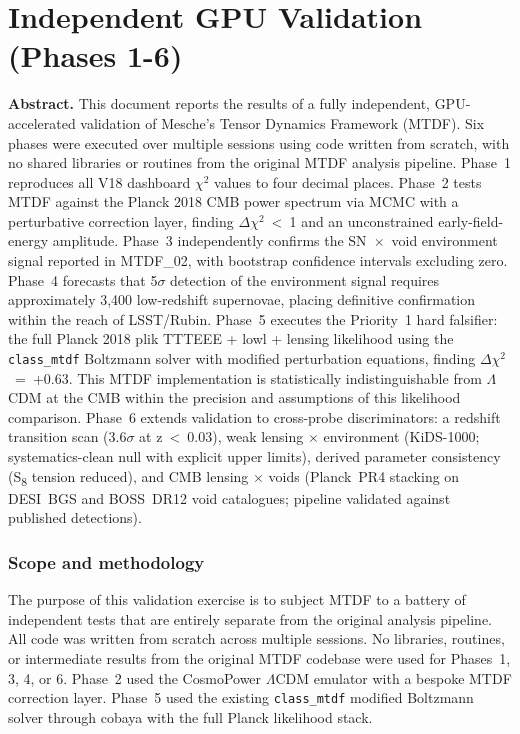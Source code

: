 \documentclass[11pt,a4paper]{article}
\begin{document}
\part{Independent GPU Validation (Phases 1-6)}

\begin{mdframed}[linecolor=accent,linewidth=0.5pt,backgroundcolor=callout-bg,leftline=true,rightline=true,topline=true,bottomline=true,innerleftmargin=8pt,innerrightmargin=8pt,innertopmargin=6pt,innerbottommargin=6pt]
\textbf{Abstract.}
This document reports the results of a fully independent, GPU-accelerated validation of Mesche's Tensor Dynamics Framework (MTDF). Six phases were executed over multiple sessions using code written from scratch, with no shared libraries or routines from the original MTDF analysis pipeline. Phase~1 reproduces all V18 dashboard $\chi$$^{2}$ values to four decimal places. Phase~2 tests MTDF against the Planck 2018 CMB power spectrum via MCMC with a perturbative correction layer, finding $\Delta$$\chi$$^{2}$~<~1 and an unconstrained early-field-energy amplitude. Phase~3 independently confirms the SN~$\times$~void environment signal reported in MTDF\_\allowbreak{}02, with bootstrap confidence intervals excluding zero. Phase~4 forecasts that 5$\sigma$ detection of the environment signal requires approximately 3,400 low-redshift supernovae, placing definitive confirmation within the reach of LSST/\allowbreak{}Rubin. Phase~5 executes the Priority~1 hard falsifier: the full Planck 2018 plik TTTEEE + lowl + lensing likelihood using the \texttt{class\_\allowbreak{}mtdf} Boltzmann solver with modified perturbation equations, finding $\Delta$$\chi$$^{2}$~=~+0.63. This MTDF implementation is statistically indistinguishable from $\Lambda$CDM at the CMB within the precision and assumptions of this likelihood comparison. Phase~6 extends validation to cross-probe discriminators: a redshift transition scan (3.6$\sigma$ at z~<~0.03), weak lensing $\times$ environment (KiDS-1000; systematics-clean null with explicit upper limits), derived parameter consistency (S\textsubscript{8} tension reduced), and CMB lensing $\times$ voids (Planck~PR4 stacking on DESI~BGS and BOSS~DR12 void catalogues; pipeline validated against published detections).
\end{mdframed}

\section{Scope and methodology}
\label{sec:sec1}
The purpose of this validation exercise is to subject MTDF to a battery of independent tests that are entirely separate from the original analysis pipeline. All code was written from scratch across multiple sessions. No libraries, routines, or intermediate results from the original MTDF codebase were used for Phases~1, 3, 4, or 6. Phase~2 used the CosmoPower $\Lambda$CDM emulator with a bespoke MTDF correction layer. Phase~5 used the existing \texttt{class\_\allowbreak{}mtdf} modified Boltzmann solver through cobaya with the full Planck likelihood stack.
\end{document}
